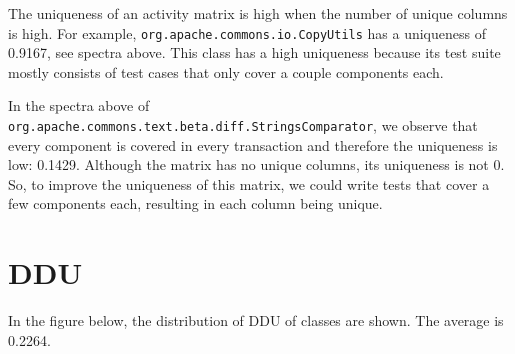 The uniqueness of an activity matrix is high when the number of unique columns is high.
For example, \texttt{org.apache.commons.io.CopyUtils} has a uniqueness of 0.9167, see spectra above.
This class has a high uniqueness because its test suite mostly consists of test cases that only cover a couple components each.

\begin{table}[]
\scriptsize
\centering
\caption{My caption}
\label{my-label}
\noindent{}
\end{table}

In the spectra above of \texttt{org.apache.commons.text.beta.diff.StringsComparator}, we observe that every component is covered in every transaction and therefore the uniqueness is low: 0.1429.
Although the matrix has no unique columns, its uniqueness is not 0.
So, to improve the uniqueness of this matrix, we could write tests that cover a few components each, resulting in each column being unique.

\section{DDU}

In the figure below, the distribution of DDU of classes are shown.
The average is 0.2264.

